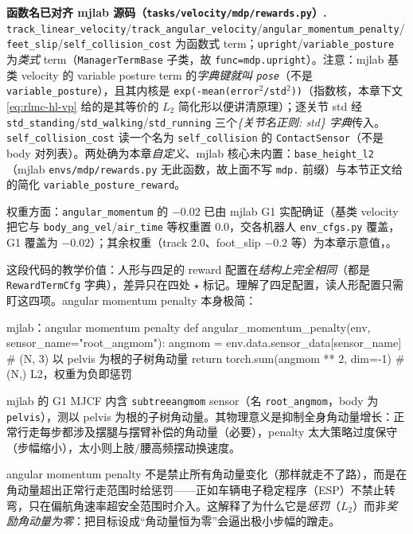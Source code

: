 \begin{note}
\textbf{函数名已对齐 mjlab 源码（\texttt{tasks/velocity/mdp/rewards.py}）.}\;
\texttt{track\_linear\_velocity}/\texttt{track\_angular\_velocity}/\texttt{angular\_momentum\_penalty}/\texttt{feet\_slip}/\texttt{self\_collision\_cost} 为函数式 term；\texttt{upright}/\texttt{variable\_posture} 为\emph{类式} term（\texttt{ManagerTermBase} 子类，故 \texttt{func=mdp.upright}）。注意：mjlab 基类 velocity 的 variable posture term 的\emph{字典键就叫 \texttt{pose}}（不是 \texttt{variable\_posture}），且其内核是 \texttt{exp(-mean(error$^2$/std$^2$))}（指数核，本章下文 \eqref{eq:rlmc-hl-vp} 给的是其等价的 $L_2$ 简化形以便讲清原理）；逐关节 std 经 \texttt{std\_standing}/\texttt{std\_walking}/\texttt{std\_running} 三个\emph{\{关节名正则: std\} 字典}传入。\texttt{self\_collision\_cost} 读一个名为 \texttt{self\_collision} 的 \texttt{ContactSensor}（不是 body 对列表）。两处确为本章\emph{自定义}、mjlab 核心未内置：\texttt{base\_height\_l2}（mjlab \texttt{envs/mdp/rewards.py} 无此函数，故上面不写 \texttt{mdp.} 前缀）与本节正文给的简化 \texttt{variable\_posture\_reward}。
\end{note}

\noindent{}权重方面：\texttt{angular\_momentum} 的 $-0.02$ 已由 mjlab G1 实配确证（基类 velocity 把它与 \texttt{body\_ang\_vel}/\texttt{air\_time} 等权重置 $0.0$，交各机器人 \texttt{env\_cfgs.py} 覆盖，G1 覆盖为 $-0.02$）；其余权重（track $2.0$、foot\_slip $-0.2$ 等）为本章示意值，。

这段代码的教学价值：人形与四足的 reward 配置在\emph{结构上完全相同}（都是 \texttt{RewardTermCfg} 字典），差异只在四处 $\star$ 标记。理解了四足配置，读人形配置只需盯这四项。angular momentum penalty 本身极简：
\begin{codebox}[Python]{mjlab：angular momentum penalty}
def angular_momentum_penalty(env, sensor_name="root_angmom"):
    angmom = env.data.sensor_data[sensor_name]   # (N, 3) 以 pelvis 为根的子树角动量
    return torch.sum(angmom ** 2, dim=-1)        # (N,) L2，权重为负即惩罚
\end{codebox}

mjlab 的 G1 MJCF 内含 \texttt{subtreeangmom} sensor（名 \texttt{root\_angmom}，body 为 \texttt{pelvis}），测以 pelvis 为根的子树角动量。其物理意义是抑制全身角动量增长：正常行走每步都涉及摆腿与摆臂补偿的角动量（必要），penalty 太大策略过度保守（步幅缩小），太小则上肢/腰高频摆动换速度。

\begin{insight}\label{ins:rlmc-hl-esp}
angular momentum penalty 不是禁止所有角动量变化（那样就走不了路），而是在角动量超出正常行走范围时给惩罚——正如车辆电子稳定程序（ESP）不禁止转弯，只在偏航角速率超安全范围时介入。这解释了为什么它是\emph{惩罚}（$L_2$）而非\emph{奖励角动量为零}：把目标设成“角动量恒为零”会逼出极小步幅的蹭走。
\end{insight}

